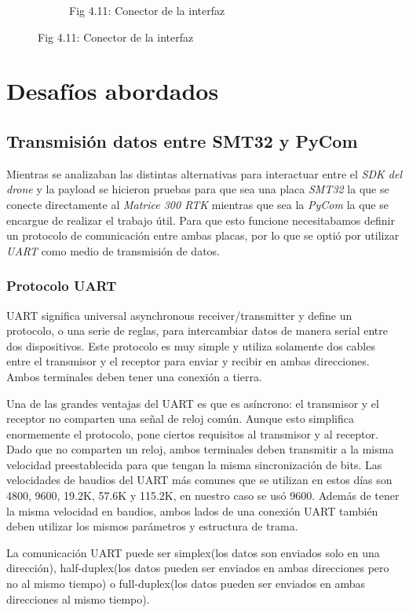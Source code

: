\documentclass[12pt]{article}
\begin{document}
\begin{figure}[ht]
\begin{subfigure}[b]{0.45\linewidth}
    \caption{Fig 4.11: Conector de la interfaz}
  \end{subfigure}
\end{figure}

\vspace*{200pt}
\newpage
\section{Desafíos abordados}

\subsection{Transmisión datos entre SMT32 y PyCom}
Mientras se analizaban las distintas alternativas para interactuar entre el \textit{SDK del drone} y la payload se hicieron pruebas para que sea una placa \textit{SMT32} la que se conecte directamente al \textit{Matrice 300 RTK} mientras que sea la \textit{PyCom} la que se encargue de  realizar el trabajo útil. Para que esto funcione necesitabamos definir un protocolo de comunicación entre ambas placas, por lo que se optió por utilizar \textit{UART} como medio de transmisión de datos.

\subsubsection{Protocolo UART}
UART significa universal asynchronous receiver/transmitter y define un protocolo, o una serie de reglas, para intercambiar datos de manera serial entre dos dispositivos. Este protocolo es muy simple y utiliza solamente dos cables entre el transmisor y el receptor para enviar y recibir en ambas direcciones. Ambos terminales deben tener una conexión a tierra. 

Una de las grandes ventajas del UART es que es asíncrono: el transmisor y el receptor no comparten una señal de reloj común. Aunque esto simplifica enormemente el protocolo, pone ciertos requisitos al transmisor y al receptor. Dado que no comparten un reloj, ambos terminales deben transmitir a la misma velocidad preestablecida para que tengan la misma sincronización de bits. Las velocidades de baudios del UART más comunes que se utilizan en estos días son 4800, 9600, 19.2K, 57.6K y 115.2K, en nuestro caso se usó 9600. Además de tener la misma velocidad en baudios, ambos lados de una conexión UART también deben utilizar los mismos parámetros y estructura de trama. \cite{uart}

La comunicación UART puede ser simplex(los datos son enviados solo en una dirección), half-duplex(los datos pueden ser enviados en ambas direcciones pero no al mismo tiempo) o full-duplex(los datos pueden ser enviados en ambas direcciones al mismo tiempo).
\end{document}
